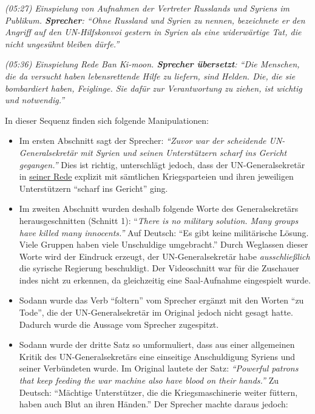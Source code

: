 \emph{(05:27) Einspielung von Aufnahmen der Vertreter Russlands und
Syriens im Publikum. \textbf{Sprecher}: ``Ohne Russland und Syrien zu
nennen, bezeichnete er den Angriff auf den UN-Hilfskonvoi gestern in
Syrien als eine widerwärtige Tat, die nicht ungesühnt bleiben dürfe.''}

\emph{(05:36) Einspielung Rede Ban Ki-moon. \textbf{Sprecher übersetzt}:
``Die Menschen, die da versucht haben lebensrettende Hilfe zu liefern,
sind Helden. Die, die sie bombardiert haben, Feiglinge. Sie dafür zur
Verantwortung zu ziehen, ist wichtig und notwendig.''}

In dieser Sequenz finden sich folgende Manipulationen:

\begin{itemize}
\tightlist
\item
  Im ersten Abschnitt sagt der Sprecher: \emph{``Zuvor war der
  scheidende UN-Generalsekretär mit Syrien und seinen Unterstützern
  scharf ins Gericht gegangen.''} Dies ist richtig, unterschlägt jedoch,
  dass der UN-Generalsekretär in
  \href{https://gadebate.un.org/en/71/secretary-general-united-nations}{seiner
  Rede} explizit mit sämtlichen Kriegsparteien und ihren jeweiligen
  Unterstützern ``scharf ins Gericht'' ging.
\item
  Im zweiten Abschnitt wurden deshalb folgende Worte des
  Generalsekretärs herausgeschnitten (Schnitt 1): ``\emph{There is no
  military solution. Many groups have killed many innocents.''} Auf
  Deutsch: ``Es gibt keine militärische Lösung. Viele Gruppen haben
  viele Unschuldige umgebracht.'' Durch Weglassen dieser Worte wird der
  Eindruck erzeugt, der UN-Generalsekretär habe \emph{ausschließlich}
  die syrische Regierung beschuldigt. Der Videoschnitt war für die
  Zuschauer indes nicht zu erkennen, da gleich­zeitig eine Saal-Aufnahme
  eingespielt wurde.
\item
  Sodann wurde das Verb ``foltern'' vom Sprecher ergänzt mit den Worten
  ``zu Tode'', die der UN-Generalsekretär im Original jedoch nicht
  gesagt hatte. Dadurch wurde die Aussage vom Sprecher zugespitzt.
\item
  Sodann wurde der dritte Satz so umformuliert, dass aus einer
  allgemeinen Kritik des UN-General­sekretärs eine einseitige
  Anschuldigung Syriens und seiner Verbündeten wurde. Im Original
  lautete der Satz: \emph{``Powerful patrons that keep feeding the war
  machine also have blood on their hands.''} Zu Deutsch: ``Mächtige
  Unterstützer, die die Kriegsmaschinerie weiter füttern, haben auch
  Blut an ihren Händen.'' Der Sprecher machte daraus jedoch:

\end{itemize}
